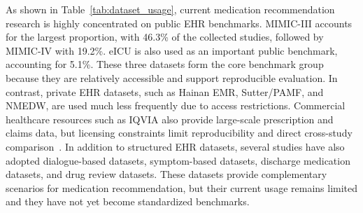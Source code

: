 \documentclass[manuscript,review]{acmart}
\begin{document}
As shown in Table~\ref{tab:dataset_usage}, current medication recommendation research is highly concentrated on public EHR benchmarks. MIMIC-III accounts for the largest proportion, with 46.3\% of the collected studies, followed by MIMIC-IV with 19.2\%. eICU is also used as an important public benchmark, accounting for 5.1\%. These three datasets form the core benchmark group because they are relatively accessible and support reproducible evaluation. In contrast, private EHR datasets, such as Hainan EMR, Sutter/PAMF, and NMEDW, are used much less frequently due to access restrictions. Commercial healthcare resources such as IQVIA also provide large-scale prescription and claims data, but licensing constraints limit reproducibility and direct cross-study comparison~\cite{iqvia_data}. In addition to structured EHR datasets, several studies have also adopted dialogue-based datasets, symptom-based datasets, discharge medication datasets, and drug review datasets. These datasets provide complementary scenarios for medication recommendation, but their current usage remains limited and they have not yet become standardized benchmarks.
\end{document}
